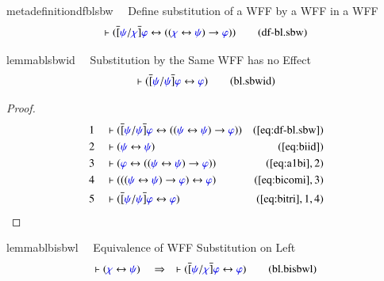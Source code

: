 \begin{restatable}{metadefinition}{dfblsbw}~~ Define substitution of a WFF by a WFF
in a WFF
\begin{align}
\vdash ( \overline{[} \mw{\psi} / \mw{\chi} \overline{]} \mw{\varphi}
    \leftrightarrow ( ( \mw{\chi} \leftrightarrow \mw{\psi} ) \rightarrow
    \mw{\varphi} ) )\label{eq:df-bl.sbw}\tag{df-bl.sbw}
\end{align}
\end{restatable}

\begin{restatable}{lemma}{blsbwid}~~ Substitution by the Same WFF has no Effect
\begin{align}
\vdash ( \overline{[} \mw{\psi} / \mw{\psi} \overline{]} \mw{\varphi}
    \leftrightarrow \mw{\varphi} )\label{eq:bl.sbwid}\tag{bl.sbwid}
\end{align}
\end{restatable}

\begin{proof}
\begin{align}
  1 &&  & \vdash ( \overline{[} \mw{\psi} / \mw{\psi} \overline{]} \mw{\varphi}
      \leftrightarrow ( ( \mw{\psi} \leftrightarrow
      \mw{\psi} ) \rightarrow \mw{\varphi} )
      )&(\mbox{\ref{eq:df-bl.sbw}})\notag
  \\ 2 &&  & \vdash ( \mw{\psi} \leftrightarrow \mw{\psi}
      )&(\mbox{\ref{eq:biid}})\notag
  \\ 3 &&  & \vdash ( \mw{\varphi} \leftrightarrow ( ( \mw{\psi}
      \leftrightarrow \mw{\psi} ) \rightarrow \mw{\varphi}
      ) )&(\mbox{\ref{eq:a1bi}},2)\notag
  \\ 4 &&  & \vdash ( ( ( \mw{\psi} \leftrightarrow \mw{\psi} ) \rightarrow
      \mw{\varphi} ) \leftrightarrow \mw{\varphi}
      )&(\mbox{\ref{eq:bicomi}},3)\notag
  \\ 5 &&  & \vdash ( \overline{[} \mw{\psi} / \mw{\psi} \overline{]}
      \mw{\varphi} \leftrightarrow \mw{\varphi}
      )&(\mbox{\ref{eq:bitri}},1,4)\notag
\end{align}
\end{proof}

\begin{restatable}{lemma}{blbisbwl}~~ Equivalence of WFF Substitution on Left
\begin{align}
\vdash ( \mw{\chi} \leftrightarrow \mw{\psi} )\quad\Rightarrow\quad \vdash (
    \overline{[} \mw{\psi} / \mw{\chi} \overline{]} \mw{\varphi}
    \leftrightarrow \mw{\varphi} )\label{eq:bl.bisbwl}\tag{bl.bisbwl}
\end{align}
\end{restatable}

